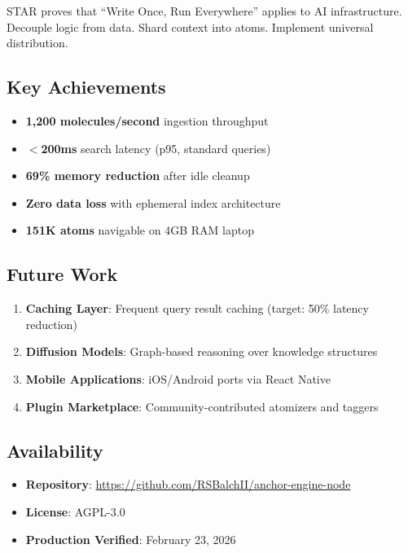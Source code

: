 \documentclass[11pt]{article}
\begin{document}
STAR proves that ``Write Once, Run Everywhere'' applies to AI infrastructure. Decouple logic from data. Shard context into atoms. Implement universal distribution.

\subsection{Key Achievements}

\begin{itemize}
    \item \checkmark \textbf{1,200 molecules/second} ingestion throughput
    \item \checkmark \textbf{$<$200ms} search latency (p95, standard queries)
    \item \checkmark \textbf{69\% memory reduction} after idle cleanup
    \item \checkmark \textbf{Zero data loss} with ephemeral index architecture
    \item \checkmark \textbf{151K atoms} navigable on 4GB RAM laptop
\end{itemize}

\subsection{Future Work}

\begin{enumerate}
    \item \textbf{Caching Layer}: Frequent query result caching (target: 50\% latency reduction)
    \item \textbf{Diffusion Models}: Graph-based reasoning over knowledge structures
    \item \textbf{Mobile Applications}: iOS/Android ports via React Native
    \item \textbf{Plugin Marketplace}: Community-contributed atomizers and taggers
\end{enumerate}

\subsection{Availability}

\begin{itemize}
    \item \textbf{Repository}: \url{https://github.com/RSBalchII/anchor-engine-node}
    \item \textbf{License}: AGPL-3.0
    \item \textbf{Production Verified}: February 23, 2026
\end{itemize}
\end{document}

